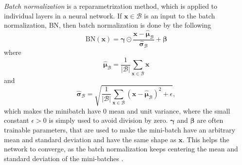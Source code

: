 \documentclass[./main.tex]{subfiles}
\begin{document}
\textit{Batch normalization} is a reparametrization method, which is applied to individual layers in a neural network. If $\bm{x} \in \mathcal{B}$ is an input to the batch normalization, $\text{BN}$, then batch normalization is done by the following
$$\text{BN}(\bm{x}) = \bm{\gamma} \odot \frac{\bm{x} - \hat{\bm{\mu}}_{\mathcal{B}}}{\hat{\bm{\sigma}}_{\mathcal{B}}} + \bm{\beta}$$
where
$$\hat{\bm{\mu}}_{\mathcal{B}} = \frac{1}{|\mathcal{B}|} \sum_{\bm{x} \in \mathcal{B}} \bm{x}$$
and
$$\hat{\bm{\sigma}}_{\mathcal{B}} = \sqrt{\frac{1}{|\mathcal{B}|} \sum_{\bm{x} \in \mathcal{B}} \left(\bm{x} - \hat{\bm{\mu}}_{\mathcal{B}} \right)^2 + \epsilon},$$
which makes the minibatch have $0$ mean and unit variance, where the small constant $\epsilon > 0$ is simply used to avoid division by zero. $\bm{\gamma}$ and $\bm{\beta}$ are often trainable parameters, that are used to make the mini-batch have an arbitrary mean and standard deviation and have the same shape as $\bm{x}$. This helps the network to converge, as the batch normalization keeps centering the mean and standard deviation of the mini-batches \cite{d2l}.
\end{document}
